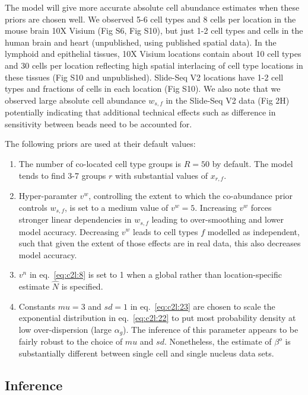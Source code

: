 \documentclass[11pt,a4paper]{article}
\begin{document}
The model will give more accurate absolute cell abundance estimates when these priors are chosen well. We observed 5-6 cell types and 8 cells per location in the mouse brain 10X Visium (Fig S6, Fig S10), but just 1-2 cell types and cells in the human brain and heart (unpublished, using published spatial data). In the lymphoid and epithelial tissues, 10X Visium locations contain about 10 cell types and 30 cells per location reflecting high spatial interlacing of cell type locations in these tissues (Fig S10 and unpublished). Slide-Seq V2 locations have 1-2 cell types and fractions of cells in each location (Fig S10). We also note that we observed large absolute cell abundance $w_{s,f}$ in the Slide-Seq V2 data (Fig 2H) potentially indicating that additional technical effects such as difference in sensitivity between beads need to be accounted for. \newline


The following priors are used at their default values:
\begin{enumerate}
    \item The number of co-located cell type groups is $R=50$ by default. The model tends to find 3-7 groups $r$ with substantial values of $x_{r,f}$.
    \item Hyper-paramter $v^w$, controlling the extent to which the co-abundance prior controls $w_{s,f}$, is set to a medium value of $v^w=5$. Increasing $v^w$ forces stronger linear dependencies in $w_{s,f}$ leading to over-smoothing and lower model accuracy. Decreasing $v^w$ leads to cell types $f$ modelled as independent, such that given the extent of those effects are in real data, this also decreases model accuracy.
    \item $v^n$ in eq.~\eqref{eq:c2l:8} is set to 1 when a global rather than location-specific estimate $\hat{N}$ is specified.
    \item Constants $mu=3$ and $sd=1$ in eq.~\eqref{eq:c2l:23} are chosen to scale the exponential distribution in eq.~\eqref{eq:c2l:22} to put most probability density at low over-dispersion (large $\alpha_g$). The inference of this parameter appears to be fairly robust to the choice of $mu$ and $sd$. Nonetheless, the estimate of $\beta^o$ is substantially different between single cell and single nucleus data sets.
\end{enumerate}

\subsection{Inference} \label{c2l_inference}
\end{document}
